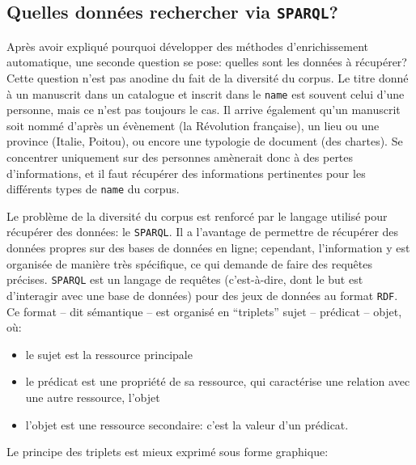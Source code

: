 \documentclass[a4paper, 12pt, twoside]{book}
\newcommand{\rdf}{\texttt{RDF}}
\newcommand{\sparql}{\texttt{SPARQL}}
\newcommand{\tname}{\texttt{name}}
\begin{document}
\subsection{Quelles données rechercher via \sparql?}
Après avoir expliqué pourquoi développer des méthodes d'enrichissement automatique, une seconde question se pose: quelles sont les données à récupérer? Cette question n'est pas anodine du fait de la diversité du corpus. Le titre donné à un manuscrit dans un catalogue et inscrit dans le \tname{} est souvent celui d'une personne, mais ce n'est pas toujours le cas. Il arrive également qu'un manuscrit soit nommé d'après un évènement (la Révolution française), un lieu ou une province (Italie, Poitou), ou encore une typologie de document (des chartes). Se concentrer uniquement sur des personnes amènerait donc à des pertes d'informations, et il faut récupérer des informations pertinentes pour les différents types de \tname{} du corpus.

Le problème de la diversité du corpus est renforcé par le langage utilisé pour récupérer des données: le \sparql{}. Il a l'avantage de permettre de récupérer des données propres sur des bases de données en ligne; cependant, l'information y est organisée de manière très spécifique, ce qui demande de faire des requêtes précises. \sparql{} est un langage de requêtes (c'est-à-dire, dont le but est d'interagir avec une base de données) pour des jeux de données au format \rdf{}. Ce format -- dit sémantique -- est organisé en \enquote{triplets} sujet -- prédicat -- objet, où:

\begin{itemize}
	\item le sujet est la ressource principale
	\item le prédicat est une propriété de sa ressource, qui caractérise une relation avec une autre ressource, l'objet
	\item l'objet est une ressource secondaire: c'est la valeur d'un prédicat.
\end{itemize}

Le principe des triplets est mieux exprimé sous forme graphique:

\end{document}

